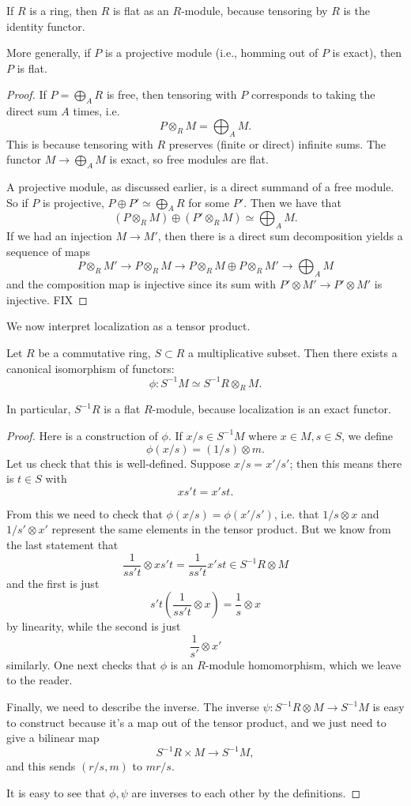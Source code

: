 \begin{example}
If $R$ is a ring, then $R$ is flat as an $R$-module, because tensoring by $R$
is the identity functor.

More generally, if $P$ is a projective module (i.e., homming out of $P$
is exact), then $P$ is flat.
\end{example}
\begin{proof}
If $P  = \bigoplus_A R$ is free, then tensoring with $P$ corresponds to taking
the direct sum $A$ times, i.e.
\[ P \otimes_R M = \bigoplus_A M.  \]
This is because tensoring with $R$ preserves (finite or direct) infinite sums.
 The functor $M \to \bigoplus_A M$ is exact, so free
modules are flat.

A projective module, as discussed earlier, is a direct summand of a free
module. So if $P$ is projective, $P \oplus P' \simeq \bigoplus_A R$ for some
$P'$. Then we have that
\[ (P \otimes_R M) \oplus (P' \otimes_R M) \simeq \bigoplus_A M.  \]
If we had an injection $M \to M'$, then there is a direct sum decomposition
yields a sequence of  maps
\[ P \otimes_R M' \to P \otimes_R M \to P \otimes_R M \oplus P \otimes_R M'
\to \bigoplus_A M  \]
and the composition map is injective since its sum with $P' \otimes
M' \to P' \otimes M'$ is injective.  FIX \end{proof}



We now interpret localization as a tensor product.
\begin{theorem}
Let $R$ be a commutative ring, $S \subset R$ a multiplicative subset. Then
there
exists a canonical isomorphism of functors:
\[ \phi:  S^{-1}M \simeq S^{-1 }R \otimes_R M . \]
\end{theorem}
In particular, $S^{-1}R $ is a flat $R$-module, because localization is an
exact functor.
\begin{proof}
Here is a construction of $\phi$. If $x/s \in S^{-1}M$ where $x \in M, s \in
S$, we define
\[ \phi(x/s) = (1/s) \otimes m.  \]
Let us check that this is well-defined. Suppose $x/s = x'/s'$; then this means
there is $t \in S$ with
\[ xs't = x'st . \]

From this we need to check that $\phi(x/s) = \phi(x'/s')$, i.e. that $1/s
\otimes x$ and $1/s' \otimes x'$ represent the same elements in the tensor
product. But we know from the last statement that
\[ \frac{1}{ss't} \otimes xs't = \frac{1}{ss't} x'st \in S^{-1}R \otimes M \]
and the first is just
\[ s't( \frac{1}{ss't} \otimes x) = \frac{1}{s} \otimes x  \]
by linearity, while the second is just
\[ \frac{1}{s'} \otimes x'  \]
similarly. One next checks that $\phi$ is an $R$-module homomorphism, which we
leave to the reader.

Finally, we need to describe the inverse. The inverse $\psi: S^{-1}R \otimes M
\to S^{-1}M$ is easy to construct because it's a map out of the tensor product,
and we just need to give a bilinear map
\[ S^{-1} R \times M \to S^{-1}M , \]
and this sends $(r/s, m)$ to $mr/s$.

It is easy to see that $\phi, \psi$ are inverses to each other by the
definitions.
\end{proof}

